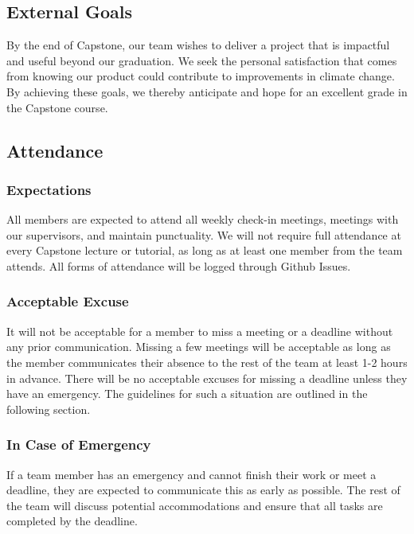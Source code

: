 \documentclass{article}
\begin{document}

\subsection*{External Goals}

By the end of Capstone, our team wishes to deliver a project that is impactful
and useful beyond our graduation. We seek the personal satisfaction that comes from
knowing our product could contribute to improvements in climate change. By achieving 
these goals, we thereby anticipate and hope for an excellent grade in the Capstone
course.

\subsection*{Attendance}

\subsubsection*{Expectations}

All members are expected to attend all weekly check-in meetings, meetings with our
supervisors, and maintain punctuality. We will not require full attendance at every
Capstone lecture or tutorial, as long as at least one member from the team attends.
All forms of attendance will be logged through Github Issues.

\subsubsection*{Acceptable Excuse}

It will not be acceptable for a member to miss a meeting or a deadline without any
prior communication. Missing a few meetings will be acceptable as long as the member
communicates their absence to the rest of the team at least 1-2 hours in advance.
There will be no acceptable excuses for missing a deadline unless they have an 
emergency. The guidelines for such a situation are outlined in the following section.

\subsubsection*{In Case of Emergency}

If a team member has an emergency and cannot finish their work or meet a deadline,
they are expected to communicate this as early as possible. The rest of the team will
discuss potential accommodations and ensure that all tasks are completed by the
deadline.
\end{document}
